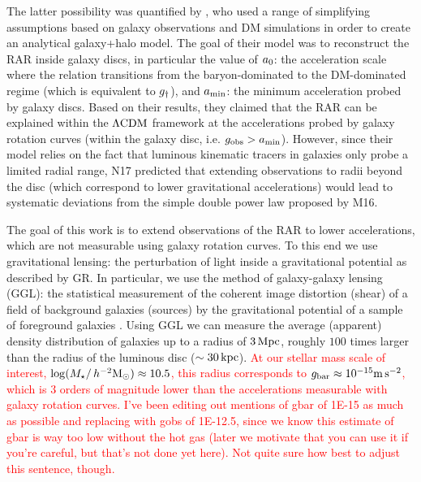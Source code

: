 \documentclass[usenatbib]{mnras}
\newcommand{\hmsun}{\,h^{-2} {\rm M_\odot}}
\newcommand{\mpss}{ {\rm m}\,{\rm s}^{-2} }
\newcommand{\lcdm}{{\rm \Lambda CDM}}
\newcommand{\un}[1]{_{\rm #1}}
\begin{document}
The latter possibility was quantified by \citet[][hereafter N17]{navarro2017}, who used a range of simplifying assumptions based on galaxy observations and DM simulations in order to create an analytical galaxy+halo model. The goal of their model was to reconstruct the RAR inside galaxy discs, in particular the value of $a\un{0}$: the acceleration scale where the relation transitions from the baryon-dominated to the DM-dominated regime (which is equivalent to $g\un{\dagger}$), and $a\un{min}$: the minimum acceleration probed by galaxy discs. Based on their results, they claimed that the RAR can be explained within the $\lcdm$ framework at the accelerations probed by galaxy rotation curves (within the galaxy disc, i.e. $g\un{obs}>a\un{min}$). However, since their model relies on the fact that luminous kinematic tracers in galaxies only probe a limited radial range, N17 predicted that extending observations to radii beyond the disc (which correspond to lower gravitational accelerations) would lead to systematic deviations from the simple double power law proposed by M16.

The goal of this work is to extend observations of the RAR to lower accelerations, which are not measurable using galaxy rotation curves. To this end we use gravitational lensing: the perturbation of light inside a gravitational potential as described by GR. In particular, we use the method of galaxy-galaxy lensing (GGL): the statistical measurement of the coherent image distortion (shear) of a field of background galaxies (sources) by the gravitational potential of a sample of foreground galaxies \cite[lenses; for examples, see e.g.][]{fischer2000ggl,hoekstra2004,mandelbaum2006,uitert2016}. Using GGL we can measure the average (apparent) density distribution of galaxies up to a radius of $3\,{\rm Mpc}$, roughly $100$ times larger than the radius of the luminous disc ($\sim 30\,{\rm kpc}$). \textcolor{red}{At our stellar mass scale of interest, $\log(M_\star/\hmsun) \approx 10.5$, this radius corresponds to $g\un{bar}\approx10^{-15} \mpss$, which is $3$ orders of magnitude lower than the accelerations measurable with galaxy rotation curves. I've been editing out mentions of gbar of 1E-15 as much as possible and replacing with gobs of 1E-12.5, since we know this estimate of gbar is way too low without the hot gas (later we motivate that you can use it if you're careful, but that's not done yet here). Not quite sure how best to adjust this sentence, though.}
\end{document}
